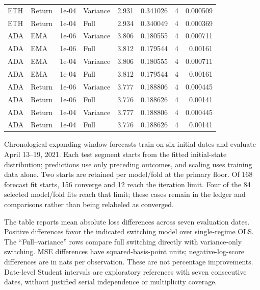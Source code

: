 \documentclass[11pt]{article}
\begin{document}
{\begin{longtable}{llllrrrr}
ETH & Return & 1e-04 & Variance & 2.931 & 0.341026 & 4 & 0.000509\\
ETH & Return & 1e-04 & Full & 2.934 & 0.340049 & 4 & 0.000369\\
ADA & EMA & 1e-06 & Variance & 3.806 & 0.180555 & 4 & 0.000711\\
ADA & EMA & 1e-06 & Full & 3.812 & 0.179544 & 4 & 0.00161\\
ADA & EMA & 1e-04 & Variance & 3.806 & 0.180555 & 4 & 0.000711\\
ADA & EMA & 1e-04 & Full & 3.812 & 0.179544 & 4 & 0.00161\\
ADA & Return & 1e-06 & Variance & 3.777 & 0.188806 & 4 & 0.000445\\
ADA & Return & 1e-06 & Full & 3.776 & 0.188626 & 4 & 0.00141\\
ADA & Return & 1e-04 & Variance & 3.777 & 0.188806 & 4 & 0.000445\\
ADA & Return & 1e-04 & Full & 3.776 & 0.188626 & 4 & 0.00141\\
\end{longtable}
}

Chronological expanding-window forecasts train on six initial dates and evaluate April 13--19, 2021. Each test segment starts from the fitted initial-state distribution; predictions use only preceding outcomes, and scaling uses training data alone. Two starts are retained per model/fold at the primary floor. Of 168 forecast fit starts, 156 converge and 12 reach the iteration limit. Four of the 84 selected model/fold fits reach that limit; these cases remain in the ledger and comparisons rather than being relabeled as converged.

The table reports mean absolute loss differences across seven evaluation dates. Positive differences favor the indicated switching model over single-regime OLS. The ``Full--variance'' rows compare full switching directly with variance-only switching. MSE differences have squared-basis-point units; negative-log-score differences are in nats per observation. These are not percentage improvements. Date-level Student intervals are exploratory references with seven consecutive dates, without justified serial independence or multiplicity coverage.
\end{document}
